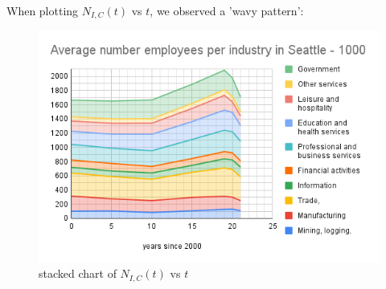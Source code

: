             
            When plotting $N_{I,C}(t)$ vs $t$, we observed a 'wavy pattern':
            \begin{figure}[H]
                  \includegraphics[width=\linewidth]{images/7D79AA67-B877-434A-BE22-808AC2C091B1.png}
                  \caption{stacked chart of $N_{I,C}(t)$ vs $t$ }
                  \label{fig:chart1}
                \end{figure}
                
